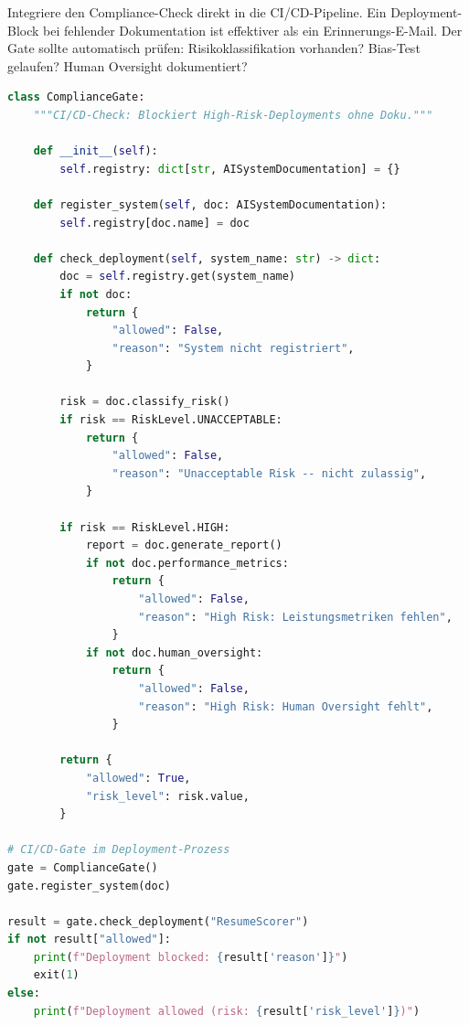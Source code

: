 \begin{praxishinweis}
Integriere den Compliance-Check direkt in die CI/CD-Pipeline. Ein Deployment-Block bei fehlender Dokumentation ist effektiver als ein Erinnerungs-E-Mail. Der Gate sollte automatisch prüfen: Risikoklassifikation vorhanden? Bias-Test gelaufen? Human Oversight dokumentiert?
\end{praxishinweis}

\begin{lstlisting}[language=Python, caption=CI-CD-Compliance-Gate]
class ComplianceGate:
    """CI/CD-Check: Blockiert High-Risk-Deployments ohne Doku."""

    def __init__(self):
        self.registry: dict[str, AISystemDocumentation] = {}

    def register_system(self, doc: AISystemDocumentation):
        self.registry[doc.name] = doc

    def check_deployment(self, system_name: str) -> dict:
        doc = self.registry.get(system_name)
        if not doc:
            return {
                "allowed": False,
                "reason": "System nicht registriert",
            }

        risk = doc.classify_risk()
        if risk == RiskLevel.UNACCEPTABLE:
            return {
                "allowed": False,
                "reason": "Unacceptable Risk -- nicht zulassig",
            }

        if risk == RiskLevel.HIGH:
            report = doc.generate_report()
            if not doc.performance_metrics:
                return {
                    "allowed": False,
                    "reason": "High Risk: Leistungsmetriken fehlen",
                }
            if not doc.human_oversight:
                return {
                    "allowed": False,
                    "reason": "High Risk: Human Oversight fehlt",
                }

        return {
            "allowed": True,
            "risk_level": risk.value,
        }

# CI/CD-Gate im Deployment-Prozess
gate = ComplianceGate()
gate.register_system(doc)

result = gate.check_deployment("ResumeScorer")
if not result["allowed"]:
    print(f"Deployment blocked: {result['reason']}")
    exit(1)
else:
    print(f"Deployment allowed (risk: {result['risk_level']})")
\end{lstlisting}


